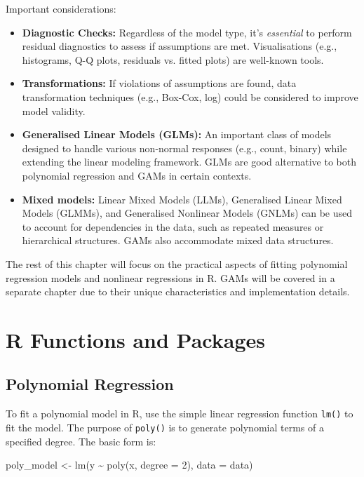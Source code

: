 \documentclass[
  letterpaper,
]{book}
\newenvironment{Shaded}{\begin{snugshade}}{\end{snugshade}}
\newcommand{\AttributeTok}[1]{\textcolor[rgb]{0.40,0.45,0.13}{#1}}
\newcommand{\DecValTok}[1]{\textcolor[rgb]{0.68,0.00,0.00}{#1}}
\newcommand{\FunctionTok}[1]{\textcolor[rgb]{0.28,0.35,0.67}{#1}}
\newcommand{\NormalTok}[1]{\textcolor[rgb]{0.00,0.23,0.31}{#1}}
\newcommand{\OtherTok}[1]{\textcolor[rgb]{0.00,0.23,0.31}{#1}}
\newcommand{\SpecialCharTok}[1]{\textcolor[rgb]{0.37,0.37,0.37}{#1}}
\providecommand{\tightlist}{%
  \setlength{\itemsep}{0pt}\setlength{\parskip}{0pt}}\usepackage{longtable,booktabs,array}
\begin{document}
Important considerations:

\begin{itemize}
\tightlist
\item
  \textbf{Diagnostic Checks:} Regardless of the model type, it's
  \emph{essential} to perform residual diagnostics to assess if
  assumptions are met. Visualisations (e.g., histograms, Q-Q plots,
  residuals vs. fitted plots) are well-known tools.
\item
  \textbf{Transformations:} If violations of assumptions are found, data
  transformation techniques (e.g., Box-Cox, log) could be considered to
  improve model validity.
\item
  \textbf{Generalised Linear Models (GLMs):} An important class of
  models designed to handle various non-normal responses (e.g., count,
  binary) while extending the linear modeling framework. GLMs are good
  alternative to both polynomial regression and GAMs in certain
  contexts.
\item
  \textbf{Mixed models:} Linear Mixed Models (LLMs), Generalised Linear
  Mixed Models (GLMMs), and Generalised Nonlinear Models (GNLMs) can be
  used to account for dependencies in the data, such as repeated
  measures or hierarchical structures. GAMs also accommodate mixed data
  structures.
\end{itemize}

The rest of this chapter will focus on the practical aspects of fitting
polynomial regression models and nonlinear regressions in R. GAMs will
be covered in a separate chapter due to their unique characteristics and
implementation details.

\section{R Functions and Packages}\label{r-functions-and-packages}

\subsection{Polynomial Regression}\label{polynomial-regression-1}

To fit a polynomial model in R, use the simple linear regression
function \texttt{lm()} to fit the model. The purpose of \texttt{poly()}
is to generate polynomial terms of a specified degree. The basic form
is:

\begin{Shaded}
\begin{Highlighting}[]
\NormalTok{poly\_model }\OtherTok{\textless{}{-}} \FunctionTok{lm}\NormalTok{(y }\SpecialCharTok{\textasciitilde{}} \FunctionTok{poly}\NormalTok{(x, }\AttributeTok{degree =} \DecValTok{2}\NormalTok{), }\AttributeTok{data =}\NormalTok{ data)}
\end{Highlighting}
\end{Shaded}
\end{document}
